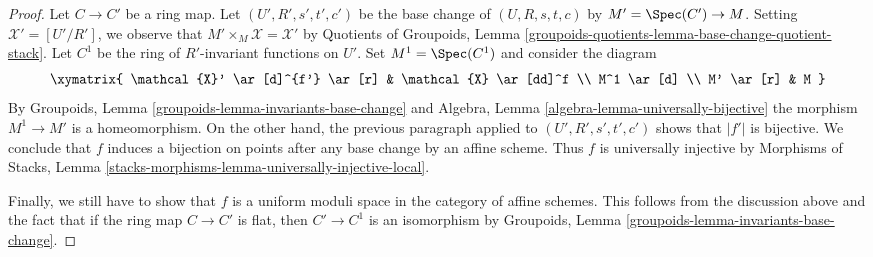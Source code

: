 \begin{proof}
\medskip\noindent
Let $C \to C'$ be a ring map. Let $(U', R', s', t', c')$ be
the base change of $(U, R, s, t, c)$ by $M' = \Spec(C') \to M$.
Setting $\mathcal{X}' = [U'/R']$, we observe that
$M' \times_M \mathcal{X} = \mathcal{X}'$ by
Quotients of Groupoids, Lemma
\ref{groupoids-quotients-lemma-base-change-quotient-stack}.
Let $C^1$ be the ring of $R'$-invariant functions on $U'$.
Set $M^1 = \Spec(C^1)$ and consider the diagram
$$
\xymatrix{
\mathcal{X}' \ar[d]^{f'} \ar[r] & \mathcal{X} \ar[dd]^f \\
M^1 \ar[d] \\
M' \ar[r] & M
}
$$
By Groupoids, Lemma \ref{groupoids-lemma-invariants-base-change} and
Algebra, Lemma \ref{algebra-lemma-universally-bijective}
the morphism $M^1 \to M'$ is a homeomorphism.
On the other hand, the previous paragraph applied to
$(U', R', s', t', c')$ shows that $|f'|$ is bijective.
We conclude that $f$ induces a bijection on points after any
base change by an affine scheme. Thus $f$ is universally injective
by Morphisms of Stacks, Lemma
\ref{stacks-morphisms-lemma-universally-injective-local}.

\medskip\noindent
Finally, we still have to show that $f$ is a uniform moduli space
in the category of affine schemes. This follows from the discussion
above and the fact that if the
ring map $C \to C'$ is flat, then $C' \to C^1$ is an isomorphism
by Groupoids, Lemma \ref{groupoids-lemma-invariants-base-change}.
\end{proof}
